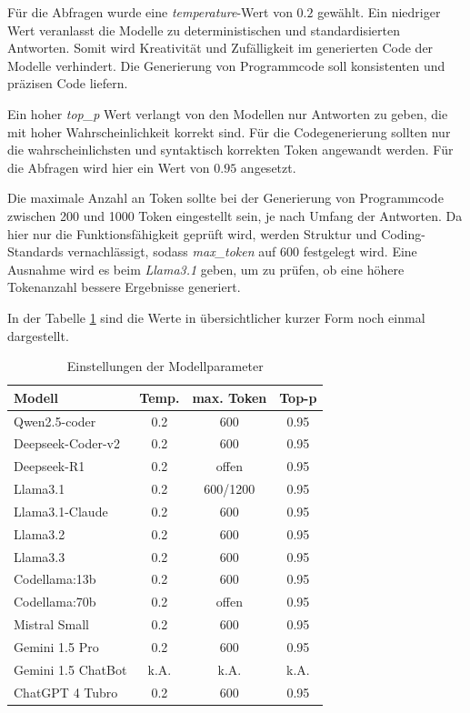 Für die Abfragen wurde eine \textit{temperature}-Wert von $0.2$ gewählt. Ein niedriger Wert veranlasst die Modelle zu deterministischen und standardisierten Antworten. Somit wird Kreativität und Zufälligkeit im generierten Code der Modelle verhindert. Die Generierung von Programmcode soll konsistenten und präzisen Code liefern.\vspace{0.2cm}

Ein hoher \textit{top\_p} Wert verlangt von den Modellen nur Antworten zu geben, die mit hoher Wahrscheinlichkeit korrekt sind. Für die Codegenerierung sollten nur die wahrscheinlichsten und syntaktisch korrekten Token angewandt werden. Für die Abfragen wird hier ein Wert von $0.95$ angesetzt.\vspace{0.2cm}

Die maximale Anzahl an Token sollte bei der Generierung von Programmcode zwischen 200 und 1000 Token eingestellt sein, je nach Umfang der Antworten. Da hier nur die Funktionsfähigkeit geprüft wird, werden Struktur und Coding-Standards vernachlässigt, sodass \textit{max\_token} auf 600 festgelegt wird. Eine Ausnahme wird es beim \textit{Llama3.1} geben, um zu prüfen, ob eine höhere Tokenanzahl bessere Ergebnisse generiert.\vspace{0.2cm}

In der Tabelle \ref{tab:params_for_llms} sind die Werte in übersichtlicher kurzer Form noch einmal dargestellt.

\begin{table}[!ht]
	\begin{tabular}{|l|c|c|c|}
		\hline
		\textbf{Modell} & \textbf{Temp.} & \textbf{max. Token} & \textbf{Top-p} \\
		\hline
		Qwen2.5-coder      &  0.2 &       600 & 0.95 \\
		Deepseek-Coder-v2  &  0.2 &       600 & 0.95 \\
		Deepseek-R1        &  0.2 &     offen & 0.95 \\
		Llama3.1           &  0.2 &  600/1200 & 0.95 \\
		Llama3.1-Claude    &  0.2 &       600 & 0.95 \\
		Llama3.2           &  0.2 &       600 & 0.95 \\
		Llama3.3           &  0.2 &       600 & 0.95 \\
		Codellama:13b      &  0.2 &       600 & 0.95 \\
		Codellama:70b      &  0.2 &     offen & 0.95 \\
		Mistral Small      &  0.2 &       600 & 0.95 \\
		Gemini 1.5 Pro     &  0.2 &       600 & 0.95 \\
		Gemini 1.5 ChatBot & k.A. &      k.A. & k.A. \\
		ChatGPT 4 Tubro    &  0.2 &       600 & 0.95 \\
		\hline
		\hline
	\end{tabular}
	\centering
	\caption{Einstellungen der Modellparameter}
	\label{tab:params_for_llms}
\end{table}

